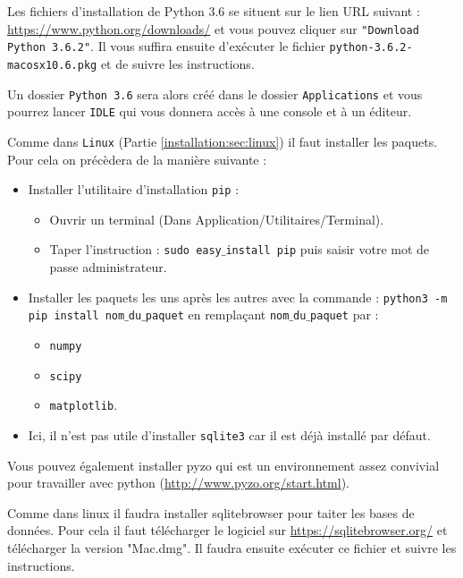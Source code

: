 \documentclass[francais,a4paper,DIV=16]{scrartcl}
\begin{document}
Les fichiers d'installation de Python 3.6 se situent sur le lien URL suivant : \url{https://www.python.org/downloads/} et vous pouvez cliquer sur \texttt{"Download Python 3.6.2"}. Il vous suffira ensuite d'exécuter le fichier \texttt{python-3.6.2-macosx10.6.pkg} et de suivre les instructions.

Un dossier \texttt{Python 3.6} sera alors créé dans le dossier \texttt{Applications} et vous pourrez lancer \texttt{IDLE} qui vous donnera accès à une console et à un éditeur. 

Comme dans \texttt{Linux} (Partie \ref{installation:sec:linux}) il faut installer les paquets. Pour cela on précèdera de la manière suivante :

\begin{itemize}
\item Installer l'utilitaire d'installation \texttt{pip} : 
\begin{itemize}
\item Ouvrir un terminal (Dans Application/Utilitaires/Terminal).
\item Taper l'instruction : \texttt{sudo easy$\_$install pip} puis saisir votre mot de passe administrateur.
\end{itemize}
\item Installer les paquets les uns après les autres avec la commande :
\texttt{python3 -m pip install nom$\_$du$\_$paquet} en remplaçant \texttt{nom$\_$du$\_$paquet} par : 
\begin{itemize}
  \item \texttt{numpy}
  \item \texttt{scipy}
  \item \texttt{matplotlib}.
\end{itemize}
\item Ici, il n'est pas utile d'installer \texttt{sqlite3} car il est déjà installé par défaut.
\end{itemize}

Vous pouvez également installer pyzo qui est un environnement assez convivial pour travailler avec python (\url{http://www.pyzo.org/start.html}).


Comme dans linux il faudra installer sqlitebrowser pour taiter les bases de données. Pour cela il faut télécharger le logiciel sur \url{https://sqlitebrowser.org/} et télécharger la version "Mac.dmg". Il faudra ensuite exécuter ce fichier et suivre les instructions.
\end{document}

